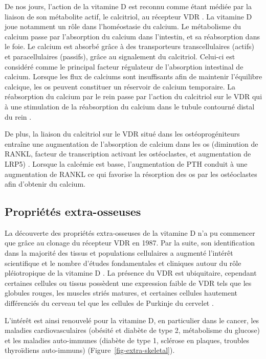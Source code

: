 \documentclass[
  a4paper,
  DIV=11,
  numbers=noendperiod,
  listof=totoc]{scrreprt}
\begin{document}
De nos jours, l'action de la vitamine D est reconnu comme étant médiée
par la liaison de son métabolite actif, le calcitriol, au récepteur VDR
\autocite{Norman.2008,Dankers.2017}. La vitamine D joue notamment un
rôle dans l'homéostasie du calcium. Le métabolisme du calcium passe par
l'absorption du calcium dans l'intestin, et sa réabsorption dans le
foie. Le calcium est absorbé grâce à des transporteurs transcellulaires
(actifs) et paracellulaires (passifs), grâce au signalement du
calcitriol. Celui-ci est considéré comme le principal facteur régulateur
de l'absorption intestinal de calcium. Lorsque les flux de calciums sont
insuffisants afin de maintenir l'équilibre calcique, les os peuvent
constituer un réservoir de calcium temporaire. La réabsorption du
calcium par le rein passe par l'action du calcitriol sur le VDR qui à
une stimulation de la réabsorption du calcium dans le tubule contourné
distal du rein \autocite{Carmeliet.2015}.

De plus, la liaison du calcitriol sur le VDR situé dans les
ostéoprogéniteurs entraîne une augmentation de l'absorption de calcium
dans les os (diminution de RANKL, facteur de transcription activant les
ostéoclastes, et augmentation de LRP5) \autocite{Carmeliet.2015}.
Lorsque la calcémie est basse, l'augmentation de PTH conduit à une
augmentation de RANKL ce qui favorise la résorption des os par les
ostéoclastes afin d'obtenir du calcium.

\hypertarget{propriuxe9tuxe9s-extra-osseuses}{%
\subsection{Propriétés
extra-osseuses}\label{propriuxe9tuxe9s-extra-osseuses}}

La découverte des propriétés extra-osseuses de la vitamine D n'a pu
commencer que grâce au clonage du récepteur VDR en 1987. Par la suite,
son identification dans la majorité des tissus et populations
cellulaires a augmenté l'intérêt scientifique et le nombre d'études
fondamentales et cliniques autour du rôle pléiotropique de la vitamine D
\autocite{Rosen.2012}. La présence du VDR est ubiquitaire, cependant
certaines cellules ou tissus possèdent une expression faible de VDR tels
que les globules rouges, les muscles striés matures, et certaines
cellules hautement différenciés du cerveau tel que les cellules de
Purkinje du cervelet \autocite{Bouillon.2008}.

L'intérêt est ainsi renouvelé pour la vitamine D, en particulier dans le
cancer, les maladies cardiovasculaires (obésité et diabète de type 2,
métabolisme du glucose) et les maladies auto-immunes (diabète de type 1,
sclérose en plaques, troubles thyroïdiens auto-immuns)
\autocite{Dankers.2017,Caprio.2017} (Figure~\ref{fig-extra-skeletal}).
\end{document}
